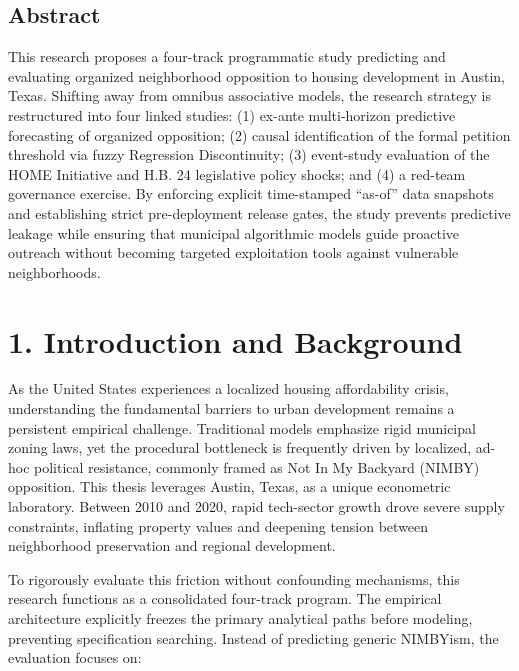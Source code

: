 \subsection*{Abstract}
This research proposes a four-track programmatic study predicting and evaluating organized neighborhood opposition to housing development in Austin, Texas. Shifting away from omnibus associative models, the research strategy is restructured into four linked studies: (1) ex-ante multi-horizon predictive forecasting of organized opposition; (2) causal identification of the formal petition threshold via fuzzy Regression Discontinuity; (3) event-study evaluation of the HOME Initiative and H.B. 24 legislative policy shocks; and (4) a red-team governance exercise. By enforcing explicit time-stamped ``as-of'' data snapshots and establishing strict pre-deployment release gates, the study prevents predictive leakage while ensuring that municipal algorithmic models guide proactive outreach without becoming targeted exploitation tools against vulnerable neighborhoods.

\section*{1. Introduction and Background}
As the United States experiences a localized housing affordability crisis, understanding the fundamental barriers to urban development remains a persistent empirical challenge. Traditional models emphasize rigid municipal zoning laws, yet the procedural bottleneck is frequently driven by localized, ad-hoc political resistance, commonly framed as Not In My Backyard (NIMBY) opposition. This thesis leverages Austin, Texas, as a unique econometric laboratory. Between 2010 and 2020, rapid tech-sector growth drove severe supply constraints, inflating property values and deepening tension between neighborhood preservation and regional development.

To rigorously evaluate this friction without confounding mechanisms, this research functions as a consolidated four-track program. The empirical architecture explicitly freezes the primary analytical paths before modeling, preventing specification searching. Instead of predicting generic NIMBYism, the evaluation focuses on:

